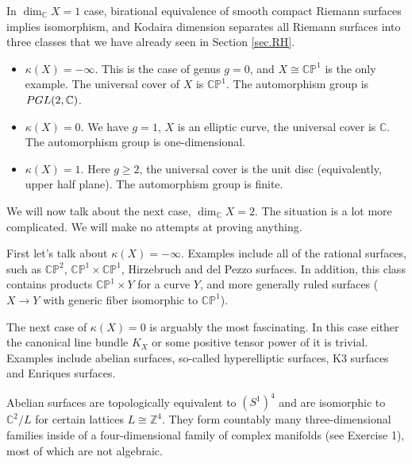 \documentclass[11pt]{article}
\numberwithin{equation}{section}
\numberwithin{footnote}{section}
\renewcommand{\P}{{\mathbb P}}
\newcommand{\Z}{{\mathbb Z}}
\newcommand{\C}{{\mathbb C}}
\begin{document}
\smallskip
In $\dim_\C X = 1$ case, birational equivalence of smooth compact Riemann surfaces implies isomorphism, and Kodaira dimension separates all Riemann surfaces into three classes that we have already seen in Section \ref{sec.RH}.
\begin{itemize}
\item $\kappa(X)=-\infty.$ This is the case of genus $g=0$, and $X\cong \C\P^1$ is the only example. The universal cover of $X$ is $\C\P^1$. The automorphism group is ${\rm PGL}(2,\C)$.

\item $\kappa(X)=0.$ We have $g=1$, $X$ is an elliptic curve, the universal cover is $\C$. The automorphism group is one-dimensional.

\item $\kappa(X)=1.$ Here $g\geq 2$, the universal cover is the unit disc (equivalently, upper half plane). The automorphism group is finite.

\end{itemize}

We will now talk about the next case, $\dim_\C X = 2$. The situation is a lot more complicated. We will make no attempts at proving anything.

\smallskip
First let's talk about 
$\kappa(X) = -\infty.$ Examples include all of the rational surfaces, such as $\C\P^2$, $\C\P^1\times \C\P^1$, Hirzebruch and del Pezzo surfaces. In addition, this class contains products $\C\P^1 \times Y$ for a curve $Y$, and more generally ruled surfaces ($X\to Y$ with generic fiber isomorphic to $\C\P^1$).

\smallskip
The next case of 
$\kappa(X) = 0$ is arguably the most fascinating. In this case either the canonical line bundle $K_X$ or some positive tensor power of it is trivial. Examples include abelian surfaces,
so-called hyperelliptic surfaces, K3 surfaces and Enriques surfaces.

\smallskip 
Abelian surfaces are topologically equivalent to $(S^1)^4$ and are isomorphic to $\C^2/L$ for certain lattices $L\cong \Z^4$. They form countably many three-dimensional families inside of a four-dimensional family of complex manifolds (see Exercise 1), most of which are not algebraic. 

\end{document}
